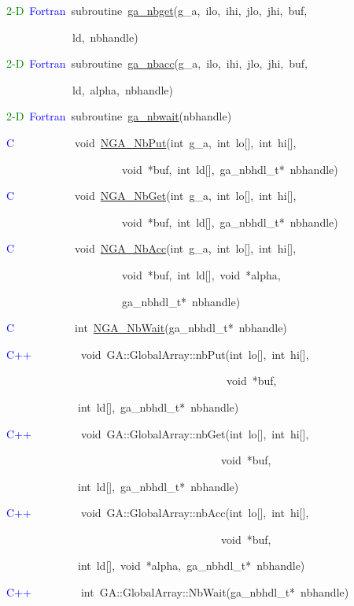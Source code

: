 \textcolor{green}{2-D}~\textcolor{blue}{Fortran}~subroutine~\href{https://hpc.pnl.gov/globalarrays/api/f_op_api.html\#ga_nbget}{ga\_{}nbget}(g\_a,~ilo,~ihi,~jlo,~jhi,~buf,~

~~~~~~~~~~~~ld,~nbhandle)~

\textcolor{green}{2-D}~\textcolor{blue}{Fortran}~subroutine~\href{https://hpc.pnl.gov/globalarrays/api/f_op_api.html\#ga_nbacc}{ga\_{}nbacc}(g\_a,~ilo,~ihi,~jlo,~jhi,~buf,~

~~~~~~~~~~~~ld,~alpha,~nbhandle)~

\textcolor{green}{2-D}~\textcolor{blue}{Fortran}~subroutine~\href{https://hpc.pnl.gov/globalarrays/api/f_op_api.html\#ga_nbwait}{ga\_{}nbwait}(nbhandle)

\textcolor{blue}{C}~~~~~~~~~~~void~\href{https://hpc.pnl.gov/globalarrays/api/c_op_api.html\#ga_nbput}{NGA\_{}NbPut}(int~g\_a,~int~lo{[}{]},~int~hi{[}{]},~

~~~~~~~~~~~~~~~~~~~~~void~{*}buf,~int~ld{[}{]},~ga\_nbhdl\_t{*}~nbhandle)~

\textcolor{blue}{C}~~~~~~~~~~~void~\href{https://hpc.pnl.gov/globalarrays/api/c_op_api.html\#ga_nbget}{NGA\_{}NbGet}(int~g\_a,~int~lo{[}{]},~int~hi{[}{]},~

~~~~~~~~~~~~~~~~~~~~~void~{*}buf,~int~ld{[}{]},~ga\_nbhdl\_t{*}~nbhandle)~

\textcolor{blue}{C}~~~~~~~~~~~void~\href{https://hpc.pnl.gov/globalarrays/api/c_op_api.html\#ga_nbacc}{NGA\_{}NbAcc}(int~g\_a,~int~lo{[}{]},~int~hi{[}{]},~

~~~~~~~~~~~~~~~~~~~~~void~{*}buf,~int~ld{[}{]},~void~{*}alpha,~

~~~~~~~~~~~~~~~~~~~~~ga\_nbhdl\_t{*}~nbhandle)~

\textcolor{blue}{C}~~~~~~~~~~~int~\href{https://hpc.pnl.gov/globalarrays/api/c_op_api.html\#ga_nbwait}{NGA\_{}NbWait}(ga\_nbhdl\_t{*}~nbhandle)

\textcolor{blue}{C++}~~~~~~~~~void~GA::GlobalArray::nbPut(int~lo{[}{]},~int~hi{[}{]},~

~~~~~~~~~~~~~~~~~~~~~~~~~~~~~~~~~~~~~~~~void~{*}buf,~

~~~~~~~~~~~~~int~ld{[}{]},~ga\_nbhdl\_t{*}~nbhandle)~

\textcolor{blue}{C++}~~~~~~~~~void~GA::GlobalArray::nbGet(int~lo{[}{]},~int~hi{[}{]},~

~~~~~~~~~~~~~~~~~~~~~~~~~~~~~~~~~~~~~~~void~{*}buf,~

~~~~~~~~~~~~~int~ld{[}{]},~ga\_nbhdl\_t{*}~nbhandle)~

\textcolor{blue}{C++}~~~~~~~~~void~GA::GlobalArray::nbAcc(int~lo{[}{]},~int~hi{[}{]},~

~~~~~~~~~~~~~~~~~~~~~~~~~~~~~~~~~~~~~~~void~{*}buf,~

~~~~~~~~~~~~~int~ld{[}{]},~void~{*}alpha,~ga\_nbhdl\_t{*}~nbhandle)~

\textcolor{blue}{C++}~~~~~~~~~int~GA::GlobalArray::NbWait(ga\_nbhdl\_t{*}~nbhandle)

